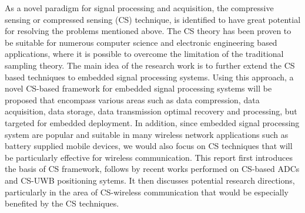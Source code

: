 As a novel paradigm for signal processing and acquisition, the compressive sensing or compressed sensing (CS) technique, is identified to have great potential for resolving the problems mentioned above. The CS theory has been proven to be suitable for numerous computer science and electronic engineering based applications, where it is possible to overcome the limitation of the traditional sampling theory. The main idea of the research work is to further extend the CS based techniques to embedded signal processing systems. Using this approach, a novel CS-based framework for embedded signal processing systems will be proposed that encompass various areas such as data compression, data acquisition, data storage, data transmission optimal recovery and processing, but targeted for embedded deployment. In addition, since embedded signal processing system are popular and suitable in many wireless network applications such as battery supplied mobile devices, we would also focus on CS techniques that will be particularly effective for wireless communication. This report first introduces the basis of CS framework, follows by recent works performed on CS-based ADCs and CS-UWB positioning sytems. It then discusses potential research directions, particularly in the area of CS-wireless communication that would be especially benefited by the CS techniques.

